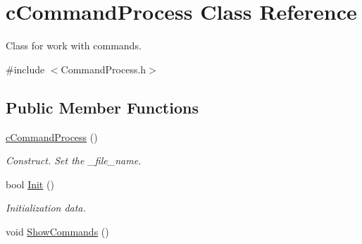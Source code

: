 \hypertarget{classcCommandProcess}{
\section{cCommandProcess Class Reference}
\label{classcCommandProcess}
}


Class for work with commands.  




{\ttfamily \#include $<$CommandProcess.h$>$}

\subsection*{Public Member Functions}
\begin{DoxyCompactItemize}
\item 
\hypertarget{classcCommandProcess_a14f5fd372a266c4905eacd0a4a04ab90}{
\hyperlink{classcCommandProcess_a14f5fd372a266c4905eacd0a4a04ab90}{cCommandProcess} ()}
\label{classcCommandProcess_a14f5fd372a266c4905eacd0a4a04ab90}

\begin{DoxyCompactList}\small\item\em Construct. Set the \_\-file\_\-name. \end{DoxyCompactList}\item 
bool \hyperlink{classcCommandProcess_acbe3099e3c7ea7e6f05258105bf63555}{Init} ()
\begin{DoxyCompactList}\small\item\em Initialization data. \end{DoxyCompactList}\item 
\hypertarget{classcCommandProcess_a7b044faa9442ab406c5b39969f5d256d}{
void \hyperlink{classcCommandProcess_a7b044faa9442ab406c5b39969f5d256d}{ShowCommands} ()}
\label{classcCommandProcess_a7b044faa9442ab406c5b39969f5d256d}


\end{DoxyCompactItemize}
